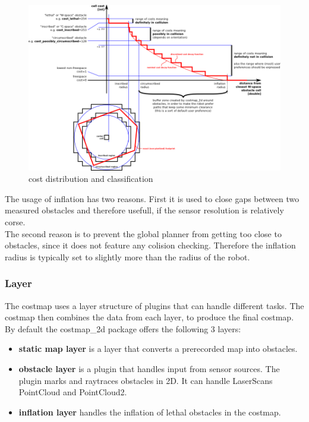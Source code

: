 \begin{figure}[H]
	\centering
	\includegraphics[width=\linewidth]{Pictures/costmapinflation}
	\caption{cost distribution and classification \cite{costmap}}
	\label{costdistribution}
\end{figure}

The usage of inflation has two reasons. First it is used to close gaps between two measured obstacles and therefore usefull, if the sensor resolution is relatively corse.\\
The second reason is to prevent the global planner from getting too close to obstacles, since it does not feature any colision checking. Therefore the inflation radius is typically set to slightly more than the radius of the robot\cite{costmap}.

\subsubsection{Layer}
The costmap uses a layer structure of plugins that can handle different tasks. The costmap then combines the data from each layer, to produce the final costmap.\\

By default the costmap\_2d package offers the following 3 layers:
\begin{itemize}
	\item \textbf{static map layer} is a layer that converts a prerecorded map into obstacles.
	\item  \textbf{obstacle layer} is a plugin that handles input from sensor sources. The plugin marks and raytraces obstacles in 2D. It can handle LaserScans PointCloud and PointCloud2.
	\item \textbf{inflation layer} handles the inflation of lethal obstacles in the costmap.
\end{itemize}

